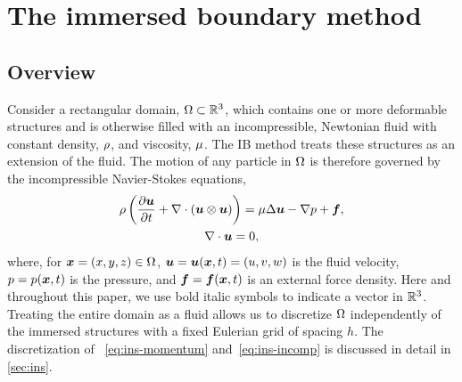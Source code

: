 \section{The immersed boundary method}\label{sec:ib}

\subsection{Overview}\label{sec:ib_old}

Consider a rectangular domain, $\Omega\subset\mathbb{R}^3$, which contains one or more deformable structures and is
otherwise filled with an incompressible, Newtonian fluid with constant density, $\rho$, and viscosity,
$\mu$. The IB method treats these structures as an extension of the fluid. The motion of any particle in
$\Omega$ is therefore governed by the incompressible Navier-Stokes equations,
\begin{gather}
    \density\left(\frac{\partial\u}{\partial t} + \div(\u\otimes\u)\right) = \viscosity\laplacian \u - \grad p + \f, \label{eq:ins-momentum} \\
    \div \u = 0, \label{eq:ins-incomp}
\end{gather}
where, for $\boldsymbol{x} = (x, y, z) \in \Omega$, $\boldsymbol{u} = \boldsymbol{u}(\boldsymbol{x}, t) = (u, v, w)$ is the fluid velocity, $p = p(\boldsymbol{x}, t)$ is the
pressure, and $\boldsymbol{f} = \boldsymbol{f}(\boldsymbol{x}, t)$ is an external force density. Here and throughout this paper, we use bold italic
symbols to indicate a vector in $\mathbb{R}^3$. Treating the entire domain as a fluid allows us to discretize $\Omega$
independently of the immersed structures with a fixed Eulerian grid of spacing $h$. The discretization of~%
\eqref{eq:ins-momentum} and~\eqref{eq:ins-incomp} is discussed in detail in \cref{sec:ins}.


